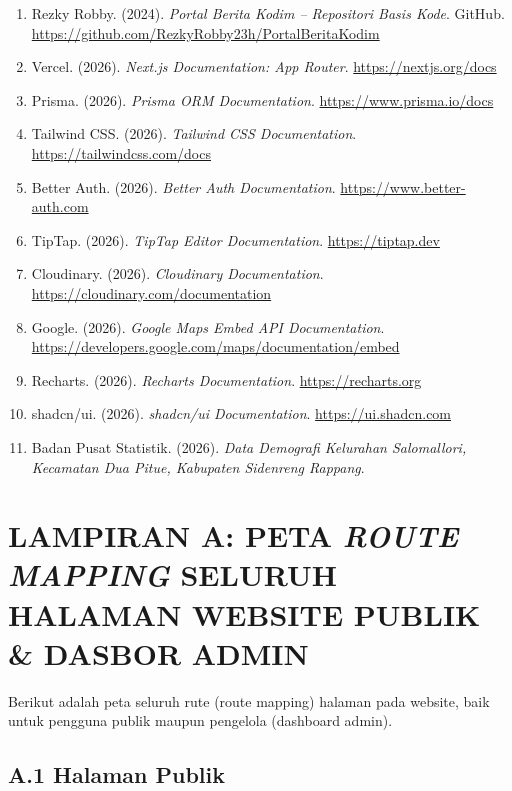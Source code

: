 \documentclass[12pt,a4paper]{report}
\begin{document}
\begin{enumerate}[leftmargin=2em, itemsep=6pt]
    \item Rezky Robby. (2024). \emph{Portal Berita Kodim -- Repositori Basis Kode}. GitHub. \url{https://github.com/RezkyRobby23h/PortalBeritaKodim}
    \item Vercel. (2026). \emph{Next.js Documentation: App Router}. \url{https://nextjs.org/docs}
    \item Prisma. (2026). \emph{Prisma ORM Documentation}. \url{https://www.prisma.io/docs}
    \item Tailwind CSS. (2026). \emph{Tailwind CSS Documentation}. \url{https://tailwindcss.com/docs}
    \item Better Auth. (2026). \emph{Better Auth Documentation}. \url{https://www.better-auth.com}
    \item TipTap. (2026). \emph{TipTap Editor Documentation}. \url{https://tiptap.dev}
    \item Cloudinary. (2026). \emph{Cloudinary Documentation}. \url{https://cloudinary.com/documentation}
    \item Google. (2026). \emph{Google Maps Embed API Documentation}. \url{https://developers.google.com/maps/documentation/embed}
    \item Recharts. (2026). \emph{Recharts Documentation}. \url{https://recharts.org}
    \item shadcn/ui. (2026). \emph{shadcn/ui Documentation}. \url{https://ui.shadcn.com}
    \item Badan Pusat Statistik. (2026). \emph{Data Demografi Kelurahan Salomallori, Kecamatan Dua Pitue, Kabupaten Sidenreng Rappang}.
\end{enumerate}

\clearpage

\appendix

\chapter{LAMPIRAN A: PETA \emph{ROUTE MAPPING} SELURUH HALAMAN WEBSITE PUBLIK \& DASBOR ADMIN}

Berikut adalah peta seluruh rute (route mapping) halaman pada website, baik untuk pengguna publik maupun pengelola (dashboard admin).

\section*{A.1 Halaman Publik}
\end{document}
